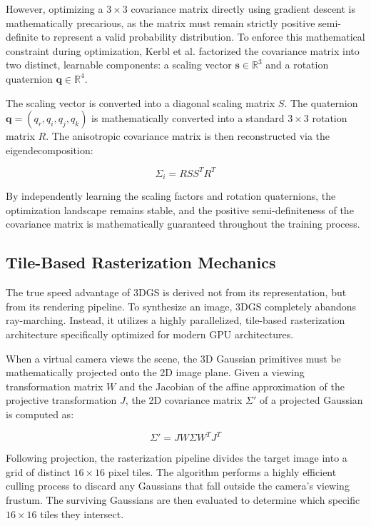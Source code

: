 \documentclass[12pt,a4paper,oneside]{report}
\begin{document}
However, optimizing a $3 \times 3$ covariance matrix directly using gradient descent is mathematically precarious, as the matrix must remain strictly positive semi-definite to represent a valid probability distribution. To enforce this mathematical constraint during optimization, Kerbl et al. factorized the covariance matrix into two distinct, learnable components: a scaling vector $\mathbf{s} \in \mathbb{R}^3$ and a rotation quaternion $\mathbf{q} \in \mathbb{R}^4$. 

The scaling vector is converted into a diagonal scaling matrix $S$. The quaternion $\mathbf{q} = (q_r, q_i, q_j, q_k)$ is mathematically converted into a standard $3 \times 3$ rotation matrix $R$. The anisotropic covariance matrix is then reconstructed via the eigendecomposition:

\begin{equation}
\Sigma_i = R S S^T R^T
\end{equation}

By independently learning the scaling factors and rotation quaternions, the optimization landscape remains stable, and the positive semi-definiteness of the covariance matrix is mathematically guaranteed throughout the training process.

\subsection{Tile-Based Rasterization Mechanics}

The true speed advantage of 3DGS is derived not from its representation, but from its rendering pipeline. To synthesize an image, 3DGS completely abandons ray-marching. Instead, it utilizes a highly parallelized, tile-based rasterization architecture specifically optimized for modern GPU architectures.

When a virtual camera views the scene, the 3D Gaussian primitives must be mathematically projected onto the 2D image plane. Given a viewing transformation matrix $W$ and the Jacobian of the affine approximation of the projective transformation $J$, the 2D covariance matrix $\Sigma'$ of a projected Gaussian is computed as:

\begin{equation}
\Sigma' = J W \Sigma W^T J^T
\end{equation}

Following projection, the rasterization pipeline divides the target image into a grid of distinct $16 \times 16$ pixel tiles. The algorithm performs a highly efficient culling process to discard any Gaussians that fall outside the camera's viewing frustum. The surviving Gaussians are then evaluated to determine which specific $16 \times 16$ tiles they intersect. 
\end{document}
